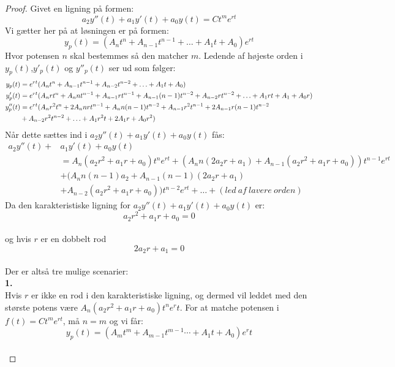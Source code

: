 \begin{proof}
Givet en ligning på formen:
\begin{equation*}
a_2y''(t)+a_1y'(t)+a_0y(t)=Ct^me^{rt}
\end{equation*}
Vi gætter her på at løsningen er på formen:
\begin{equation*}
y_p(t)= (A_nt^n+A_{n-1}t^{n-1} + \hdots +A_1t+A_0)e^{rt}
\end{equation*}
Hvor potensen $n$ skal bestemmes så den matcher $m$.
Ledende af højeste orden i $y_p(t)$,$y'_p(t)$ og $y''_p(t)$ ser ud som følger:
\begin{align*}
     y_p(t) &=e^{rt}(A_nt^n+A_{n-1}t^{n-1}+A_{n-2}t^{n-2}+\hdots + A_1t+A_0) \\ \break
    y'_p(t) &=e^{rt}(A_nrt^n+A_nnt^{n-1}+A_{n-1}rt^{n-1}+A_{n-1}(n-1)t^{n-2}+A_{n-2}rt^{n-2}+\hdots + A_1rt+A_1+A_0r) \\
    y''_p(t) &=e^{rt}(A_nr^2t^n+2A_nnrt^{n-1}+A_nn(n-1)t^{n-2}+A_{n-1}r^2t^{n-1}+2A_{n-1}r(n-1)t^{n-2} \\ 
    &+A_{n-2}r^2t^{n-2}+\hdots + A_1r^2t+2A_1r+A_0r^2)
\end{align*}
Når dette sættes ind i $a_2y''(t)+a_1y'(t)+a_0y(t)$ fås:
\begin{align*}
 a_2y''(t)+ & a_1y'(t)+a_0y(t) \\ 
 & = A_n(a_2r^2+a_1r+a_0)t^ne^{rt} + (A_nn(2a_2r+a_1) +A_{n-1}(a_2r^2+a_1r+a_0))t^{n-1}e^{rt} \\ 
 & +(A_nn(n-1)a_2+A_{n-1}(n-1)(2a_2r+a_1)\\
 &+A_{n-2}(a_2r^2+a_1r+a_0))t^{n-2}e^{rt}+ \hdots + (led\ af\ lavere\ orden)
\end{align*}
Da den karakteristiske ligning for $a_2y''(t)+a_1y'(t)+a_0y(t)$ er: \\
$$a_2r^2+a_1r+a_0=0$$ \\
og hvis $r$ er en dobbelt rod\\
$$2a_2r+a_1=0$$\\ 
Der er altså tre mulige scenarier: \\

\textbf{1.} \\
Hvis $r$ er ikke en rod i den karakteristiske ligning, og dermed vil leddet med den største potens være $A_n(a_2r^2+a_1r+a_0)t^ne^rt$. For at matche potensen i $f(t)=Ct^me^{rt}$, må $n=m$ og vi får: \\
\begin{equation*}
y_p(t)= (A_mt^m+A_{m-1}t^{m-1}  \cdots +A_1t+A_0)e^rt
\end{equation*} \\


\end{proof}
